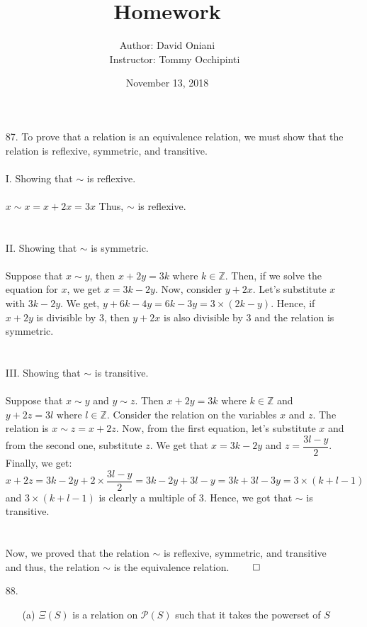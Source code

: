 \documentclass[12pt, a4paper]{article}
\title{\bf{Homework \textnumero 11}}
\author{Author: David Oniani
\\
\ \ \ Instructor: Tommy Occhipinti}
\date{November 13, 2018}
\newcommand{\ints}{\mathbb{Z}}
\begin{document}
\maketitle
\begin{itemize}
\item[87.]
To prove that a relation is an equivalence relation, we must show that the
relation is reflexive, symmetric, and transitive.\\\\
I. Showing that $\sim$ is reflexive.\\\\
$x \sim x = x + 2x = 3x$ Thus, $\sim$ is reflexive.\\\\\\
II. Showing that $\sim$ is symmetric.\\\\
Suppose that $x \sim y$, then $x + 2y = 3k \mbox{ where } k \in \ints$. Then, if we solve the
equation for $x$, we get $x = 3k - 2y$. Now, consider $y + 2x$. Let's substitute $x$ with $3k - 2y$.
We get, $y + 6k - 4y = 6k - 3y = 3 \times (2k - y)$. Hence, if $x + 2y$ is divisible by 3, then $y + 2x$
is also divisible by 3 and the relation is symmetric.\\\\\\
III. Showing that $\sim$ is transitive.\\\\
Suppose that $x \sim y$ and $y \sim z$. Then $x + 2y = 3k \mbox{ where } k \in \ints$ and $y + 2z = 3l \mbox{ where } l \in \ints$.
Consider the relation on the variables $x$ and $z$. The relation is $x \sim z = x + 2z$. Now, from the first equation, let's substitute $x$
and from the second one, substitute $z$. We get that $x = 3k - 2y$ and $z = \dfrac{3l - y}{2}$. Finally, we get:
$x + 2z = 3k - 2y + 2 \times \dfrac{3l - y}{2} = 3k - 2y + 3l - y = 3k + 3l - 3y = 3 \times (k + l - 1)$ and $3 \times (k + l - 1)$
is clearly a multiple of 3. Hence, we got that $\sim$ is transitive.
\\\\\\
Now, we proved that the relation $\sim$ is reflexive, symmetric, and transitive and thus, the relation $\sim$
is the equivalence relation.
$\qed$

\newpage

\item[88.]
\begin{itemize}
\item[(a)]
$\Xi(S)$ is a relation on $\mathcal{P}(S)$ such that it takes the powerset of $S$
\item[]


\end{itemize}
\end{itemize}
\end{document}
